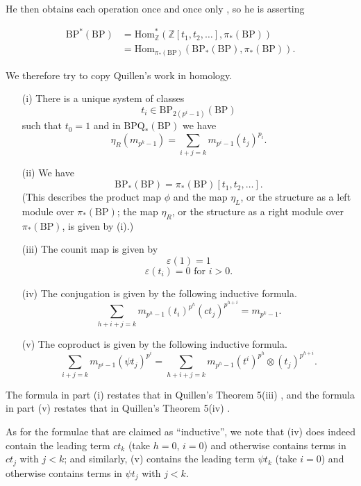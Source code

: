 \documentclass[../main]{subfiles}
\begin{document}
He then obtains each operation once and once only \cite[Theorem 5(i)]{quillen}, so he is asserting 

\begin{align*}
\mathrm {BP}^\ast(\mathrm {BP}) & = \mathrm{Hom}_{\mathbb Z}^\ast(\mathbb Z[t_1, t_2, \ldots], \pi_\ast(\mathrm{BP})) \\ & = \mathrm{Hom}_{\pi_\ast(\mathrm{BP})} (\mathrm{BP}_\ast(\mathrm{BP}), \pi_\ast(\mathrm {BP})).
\end{align*}

We therefore try to copy Quillen's work in homology. 

\begin{theorem}
\label{thm:p2c16.1}
\begin{enumerate}
    \item[(i)] There is a unique system of classes $$t_i \in \mathrm {BP}_{2(p^i - 1)} (\mathrm{BP})$$ such that $t_0 = 1$ and in $\mathrm{BPQ}_\ast(\mathrm {BP})$ we have $$\eta_R (m_{p^k - 1}) = \sum_{i + j = k} m_{p^i - 1} (t_j)^{p_i}.$$
    \item[(ii)] We have $$\mathrm{BP}_\ast(\mathrm{BP}) = \pi_\ast(\mathrm{BP}) [t_1, t_2, \ldots].$$ (This describes the product map $\phi$ and the map $\eta_L$, or the structure as a left module over $\pi_\ast(\mathrm{BP})$; the map $\eta_R$, or the structure as a right module over $\pi_\ast(\mathrm{BP})$, is given by (i).)
    \item[(iii)] The counit map is given by 
    $$\varepsilon(1) = 1$$
    $$\varepsilon(t_i) = 0 \text { for } i > 0.$$
    
    \item[(iv)] The conjugation is given by the following inductive formula. 
    $$\sum_{h + i + j = k} m_{p^h - 1} (t_i)^{p^h} (ct_j)^{p^{h + i}} = m_{p^k - 1}.$$
    
    \item[(v)] The coproduct is given by the following inductive formula. $$\sum_{i + j = k} m_{p^i - 1} (\psi t_j)^{p^i} = \sum_{h + i + j = k} m_{p^h - 1} (t^i)^{p^h} \otimes (t_j)^{p^{h + i}}.$$ 
\end{enumerate}
\end{theorem}

The formula in part (i) restates that in Quillen's Theorem 5(iii) \cite{quillen}, and the formula in part (v) restates that in Quillen's Theorem 5(iv) \cite{quillen}. 

As for the formulae that are claimed as ``inductive'', we note that (iv) does indeed contain the leading term $c t_k$ (take $h = 0$, $i = 0$) and otherwise contains terms in $c t_j$ with $j < k$; and similarly, (v) contains the leading term $\psi t_k$ (take $i = 0$) and otherwise contains terms in $\psi t_j$ with $j < k$. 
\end{document}
